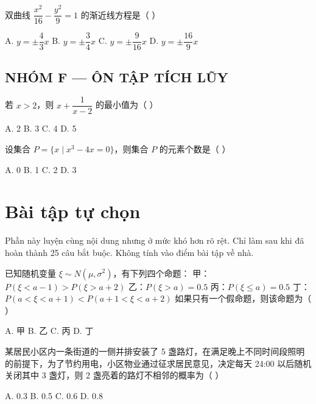 \documentclass[11pt, a4paper]{article}
\begin{document}
\begin{baitap}[23]
双曲线 $\dfrac{x^2}{16}-\dfrac{y^2}{9}=1$ 的渐近线方程是（ ）
\par\vspace{3pt}
\noindent A. $y=\pm\dfrac{4}{3}x$ \quad B. $y=\pm\dfrac{3}{4}x$ \quad C. $y=\pm\dfrac{9}{16}x$ \quad D. $y=\pm\dfrac{16}{9}x$
\end{baitap}

\subsection*{NHÓM F — ÔN TẬP TÍCH LŨY}

\begin{baitap}[24]
若 $x>2$，则 $x+\dfrac{1}{x-2}$ 的最小值为（ ）
\par\vspace{3pt}
\noindent A. 2 \quad B. 3 \quad C. 4 \quad D. 5
\end{baitap}

\begin{baitap}[25]
设集合 $P=\{x\mid x^3-4x=0\}$，则集合 $P$ 的元素个数是（ ）
\par\vspace{3pt}
\noindent A. 0 \quad B. 1 \quad C. 2 \quad D. 3
\end{baitap}

\clearpage
\section{Bài tập tự chọn}

Phần này luyện cùng nội dung nhưng ở mức khó hơn rõ rệt. Chỉ làm sau khi đã hoàn thành 25 câu bắt buộc. Không tính vào điểm bài tập về nhà.

\begin{baitap}[1]
已知随机变量 $\xi\sim N(\mu,\sigma^2)$，有下列四个命题： 甲：$P(\xi<a-1)>P(\xi>a+2)$ 乙：$P(\xi>a)=0.5$ 丙：$P(\xi\le a)=0.5$ 丁：$P(a<\xi<a+1)<P(a+1<\xi<a+2)$ 如果只有一个假命题，则该命题为（ ）
\par\vspace{3pt}
\noindent A. 甲 \quad B. 乙 \quad C. 丙 \quad D. 丁
\end{baitap}

\begin{baitap}[2]
某居民小区内一条街道的一侧并排安装了 5 盏路灯，在满足晚上不同时间段照明的前提下，为了节约用电，小区物业通过征求居民意见，决定每天 24:00 以后随机关闭其中 3 盏灯，则 2 盏亮着的路灯不相邻的概率为（ ）
\par\vspace{3pt}
\noindent A. 0.3 \quad B. 0.5 \quad C. 0.6 \quad D. 0.8
\end{baitap}
\end{document}
